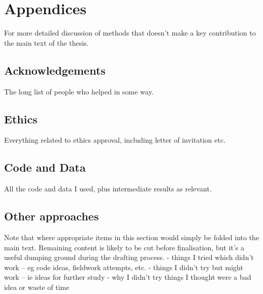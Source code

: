 \chapter{Appendices}
For more detailed discussion of methods that doesn't make a key contribution to the main text of the thesis.

\section{Acknowledgements}
The long list of people who helped in some way.

\section{Ethics}
Everything related to ethics approval, including letter of invitation etc.

\section{Code and Data}
All the code and data I used, plus intermediate results as relevant.

\section{Other approaches}
Note that where appropriate items in this section would simply be folded into the main text.  Remaining content is likely to be cut before finalisation, but it's a useful dumping ground during the drafting process.
-	things I tried which didn't work – eg code ideas, fieldwork attempts, etc.
-	things I didn't try but might work – ie ideas for further study
-	why I didn't try things I thought were a bad idea or waste of time


